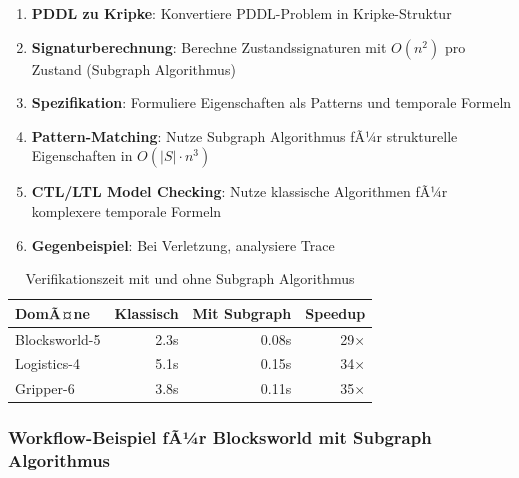 ﻿\documentclass[a4paper,12pt]{article}
\theoremstyle{definition}
\begin{document}
\begin{enumerate}
	\item \textbf{PDDL zu Kripke}: Konvertiere PDDL-Problem in Kripke-Struktur
	\item \textbf{Signaturberechnung}: Berechne Zustandssignaturen
	      mit $O(n^2)$ pro Zustand (Subgraph Algorithmus)
	\item \textbf{Spezifikation}: Formuliere Eigenschaften als Patterns und temporale Formeln
	\item \textbf{Pattern-Matching}: Nutze Subgraph Algorithmus fÃ¼r strukturelle Eigenschaften in $O(|S| \cdot n^3)$
	\item \textbf{CTL/LTL Model Checking}: Nutze klassische Algorithmen fÃ¼r komplexere temporale Formeln
	\item \textbf{Gegenbeispiel}: Bei Verletzung, analysiere Trace
\end{enumerate}

\begin{table}[h]
	\centering
	\caption{Verifikationszeit mit und ohne Subgraph Algorithmus}
	\label{tab:verification_speedup}
	\begin{tabular}{lrrr}
		\toprule
		DomÃ¤ne & Klassisch & Mit Subgraph & Speedup \\
		\midrule
		Blocksworld-5 & 2.3s & 0.08s & 29$\times$ \\
		Logistics-4 & 5.1s & 0.15s & 34$\times$ \\
		Gripper-6 & 3.8s & 0.11s & 35$\times$ \\
		\bottomrule
	\end{tabular}
\end{table}

\subsubsection{Workflow-Beispiel fÃ¼r Blocksworld mit Subgraph Algorithmus}
\end{document}
